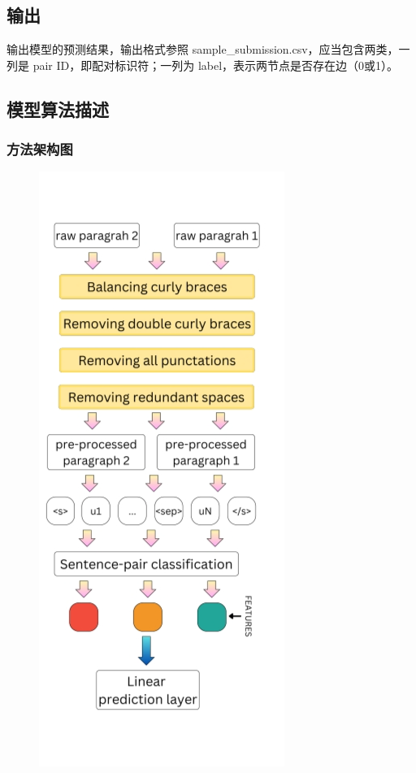 \documentclass[
]{article}
\begin{document}
\subsection{输出}\label{ux8f93ux51fa}

输出模型的预测结果，输出格式参照
sample\_submission.csv，应当包含两类，一列是 pair
ID，即配对标识符；一列为 label，表示两节点是否存在边（0或1）。

\subsection{模型算法描述}\label{ux6a21ux578bux7b97ux6cd5ux63cfux8ff0}

\subsubsection{方法架构图}\label{ux65b9ux6cd5ux67b6ux6784ux56fe}

\begin{figure}[H]
  \centering
  \includegraphics[height=0.4\textheight]{./pic/1.png}
\end{figure}
\end{document}
